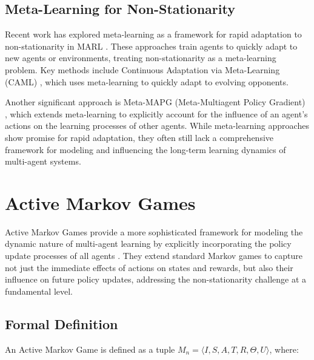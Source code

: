 \subsection{Meta-Learning for Non-Stationarity}
Recent work has explored meta-learning as a framework for rapid adaptation to non-stationarity in MARL \cite{alshedivat2018continuous, kim2021policy}. These approaches train agents to quickly adapt to new agents or environments, treating non-stationarity as a meta-learning problem. Key methods include Continuous Adaptation via Meta-Learning (CAML) \cite{alshedivat2018continuous}, which uses meta-learning to quickly adapt to evolving opponents.

Another significant approach is Meta-MAPG (Meta-Multiagent Policy Gradient) \cite{kim2021policy}, which extends meta-learning to explicitly account for the influence of an agent's actions on the learning processes of other agents. While meta-learning approaches show promise for rapid adaptation, they often still lack a comprehensive framework for modeling and influencing the long-term learning dynamics of multi-agent systems.

\section{Active Markov Games}

Active Markov Games provide a more sophisticated framework for modeling the dynamic nature of multi-agent learning by explicitly incorporating the policy update processes of all agents \cite{kim2022influencing}. They extend standard Markov games to capture not just the immediate effects of actions on states and rewards, but also their influence on future policy updates, addressing the non-stationarity challenge at a fundamental level.

\subsection{Formal Definition}

An Active Markov Game is defined as a tuple $M_n = \langle I, S, A, T, R, \Theta, U \rangle$, where:

